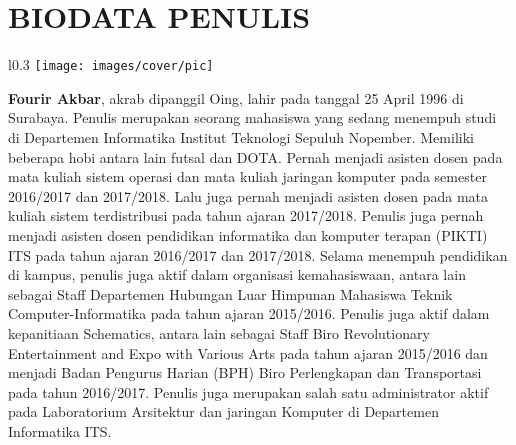 \documentclass[12pt,oneside,reqno]{ta-its}
\begin{document}
	\chapter{BIODATA PENULIS}
		\begin{wrapfigure}{l}{0.3\textwidth}
			\texttt{[image: images/cover/pic]}
		\end{wrapfigure}
		\textbf{Fourir Akbar}, akrab dipanggil Oing, lahir pada tanggal 25 April 1996 di Surabaya. Penulis merupakan seorang mahasiswa yang sedang menempuh studi di Departemen Informatika Institut Teknologi Sepuluh Nopember. Memiliki beberapa hobi antara lain futsal dan DOTA. Pernah menjadi asisten dosen pada mata kuliah sistem operasi dan mata kuliah jaringan komputer pada semester 2016/2017 dan 2017/2018. Lalu juga pernah menjadi asisten dosen pada mata kuliah sistem terdistribusi pada tahun ajaran 2017/2018. Penulis juga pernah menjadi asisten dosen pendidikan informatika dan komputer terapan (PIKTI) ITS pada tahun ajaran 2016/2017 dan 2017/2018. Selama menempuh pendidikan di kampus, penulis juga aktif dalam organisasi kemahasiswaan, antara lain sebagai Staff Departemen Hubungan Luar Himpunan Mahasiswa Teknik Computer-Informatika pada tahun ajaran 2015/2016. Penulis juga aktif dalam kepanitiaan Schematics, antara lain sebagai Staff Biro Revolutionary Entertainment and Expo with Various Arts pada tahun ajaran 2015/2016 dan menjadi Badan Pengurus Harian (BPH) Biro Perlengkapan dan Transportasi pada tahun 2016/2017. Penulis juga merupakan salah satu administrator aktif pada Laboratorium Arsitektur dan jaringan Komputer di Departemen Informatika ITS.
\end{document}
